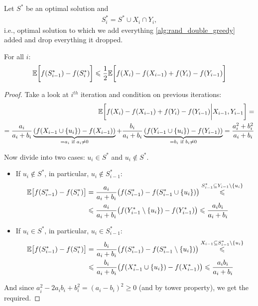 \begin{lemma}
	Let $S^*$ be an optimal solution and 
	\begin{align}
	S^*_i = S^* \cup X_i \cap Y_i,
	\end{align}
	i.e., optimal solution to which we add everything \cref{alg:rand_double_greedy} added and drop everything it dropped.
	
	For all $i$:
	\begin{align}
	\mathbb{E} \qty\bigg[f(S^*_{i-1}) - f(S^*_i)] \leqslant \frac{1}{2} \mathbb{E} \qty\bigg[f(X_i) - f(X_{i-1})+f(Y_i) - f(Y_{i-1}) ]
	\end{align}
	
	\begin{proof}
		Take a look at $i^{th}$ iteration and condition on previous iterations:
		\begin{align}
		\mathbb{E} \qty\bigg[ f(X_i) - f(X_{i-1}) + f(Y_i) - f(Y_{i-1}) \bigg\vert X_{i-1}, Y_{i-1}] =\\= \frac{a_i}{a_i+b_i} \underbrace{\qty(f(X_{i-1} \cup \qty{u_i})-f(X_{i-1}))}_{=a_i  \text{ if } a_i\neq 0} + \frac{b_i}{a_i+b_i} \underbrace{\qty(f(Y_{i-1} \cup \qty{u_i})-f(Y_{i-1}))}_{=b_i  \text{ if } b_i\neq 0} = \frac{a_i^2+b_i^2}{a_i+b_i}
		\end{align}
		
		Now divide into two cases: $u_i \in S^*$ and $u_i \notin S^*$.
		
		\begin{itemize}
			\item If $u_i \notin S^*$, in particular, $u_i \notin S^*_{i-1}$:
			\begin{align}
			\mathbb{E} \qty[f(S^*_{i-1})-f(S^*_{i}) ] &= \frac{a_i}{a_{i} + b_{i}} \qty(f(S^*_{i-1}) -f(S^*_{i-1}\cup \qty{u_i})) \stackrel{S^*_{i-1} \subseteq Y_{i-1}\setminus \qty{u_i}}{\leqslant }\\&\leqslant \frac{a_i}{a_{i} + b_{i}} \qty(f(Y^*_{i-1}\setminus \qty{u_i}) -f(Y^*_{i-1})) \leqslant \frac{a_i b_i}{a_i+b_i}
			\end{align}
			\item If $u_i \in S^*$, in particular, $u_i \in S^*_{i-1}$:
			\begin{align}
			\mathbb{E} \qty[f(S^*_{i-1})-f(S^*_{i}) ] &= \frac{b_i}{a_{i} + b_{i}} \qty(f(S^*_{i-1}) -f(S^*_{i-1}\setminus \qty{u_i})) \stackrel{X_{i-1} \subseteq S^*_{i-1} \setminus \qty{u_i}}{\leqslant }\\&\leqslant \frac{b_i}{a_{i} + b_{i}} \qty(f(X^*_{i-1}\cup \qty{u_i}) -f(X^*_{i-1})) \leqslant \frac{a_i b_i}{a_i+b_i}
			\end{align}
		\end{itemize}
		And since $a_i^2-2a_ib_i+b_i^2 = (a_i-b_i)^2 \geqslant 0$ (and by tower property), we get the required.
		
	\end{proof}
\end{lemma}


